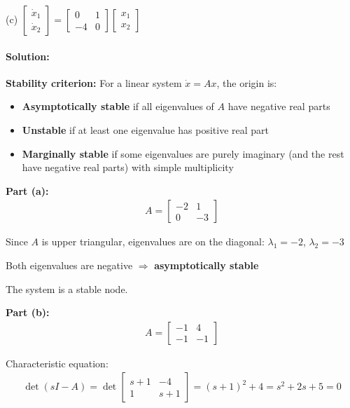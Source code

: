 \documentclass[11pt,a4paper]{article}
\begin{document}
(c) $\begin{bmatrix} \dot{x}_1 \\ \dot{x}_2 \end{bmatrix} = \begin{bmatrix} 0 & 1 \\ -4 & 0 \end{bmatrix}\begin{bmatrix} x_1 \\ x_2 \end{bmatrix}$

\paragraph{Solution:}

\textbf{Stability criterion:} For a linear system $\dot{x} = Ax$, the origin is:
\begin{itemize}
\item \textbf{Asymptotically stable} if all eigenvalues of $A$ have negative real parts
\item \textbf{Unstable} if at least one eigenvalue has positive real part
\item \textbf{Marginally stable} if some eigenvalues are purely imaginary (and the rest have negative real parts) with simple multiplicity
\end{itemize}

\textbf{Part (a):}
\begin{align}
A = \begin{bmatrix} -2 & 1 \\ 0 & -3 \end{bmatrix}
\end{align}

Since $A$ is upper triangular, eigenvalues are on the diagonal: $\lambda_1 = -2$, $\lambda_2 = -3$

Both eigenvalues are negative $\Rightarrow$ \textbf{asymptotically stable}

The system is a stable node.

\textbf{Part (b):}
\begin{align}
A = \begin{bmatrix} -1 & 4 \\ -1 & -1 \end{bmatrix}
\end{align}

Characteristic equation:
\begin{align}
\det(sI - A) = \det\begin{bmatrix} s+1 & -4 \\ 1 & s+1 \end{bmatrix} = (s+1)^2 + 4 = s^2 + 2s + 5 = 0
\end{align}
\end{document}
